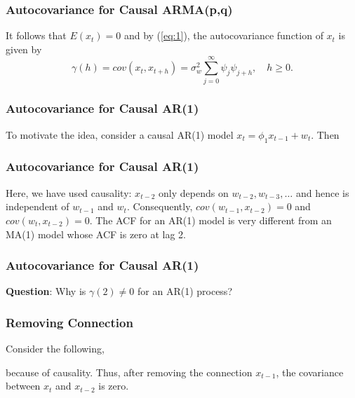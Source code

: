 \documentclass[%
xcolor=pdftex]{beamer}
\begin{document}
\begin{frame}
\frametitle{Autocovariance for Causal ARMA(p,q)}

It follows  that $E(x_t)=0$ and by (\ref{eq:1}), the
autocovariance function of $x_t$ is given by
$$
\gamma(h) =cov(x_t,x_{t+h})= \sigma^2_w \sum^\infty_{j=0} \psi_j \psi_{j+h},
\quad h\ge 0.
$$

\end{frame}







\begin{frame}
\frametitle{Autocovariance for Causal AR(1)}

To motivate the idea, consider a causal AR(1) model $x_t=\phi_1
x_{t-1}+w_t$.  Then

\vspace{40mm}

\end{frame}

\begin{frame}
\frametitle{Autocovariance for Causal AR(1)}

Here, we have used causality: $x_{t-2}$ only depends on
$w_{t-2},w_{t-3},\ldots$ and hence is independent of $w_{t-1}$
and $w_t$. Consequently, $cov(w_{t-1},x_{t-2})=0$ and
$cov(w_t,x_{t-2})=0$. The ACF for an AR(1) model is very
different from an MA(1) model whose ACF is zero at lag 2.

\end{frame}

\begin{frame}
\frametitle{Autocovariance for Causal AR(1)}

\textbf{Question}: Why is $\gamma(2)\ne 0$ for an AR(1) process?

\vspace{50mm}

\end{frame}

\begin{frame}
\frametitle{Removing Connection}

Consider the following,

\vspace{40mm}

because of causality. Thus, after removing the
connection $x_{t-1}$, the covariance between $x_t$ and
$x_{t-2}$ is zero.

\end{frame}
\end{document}
